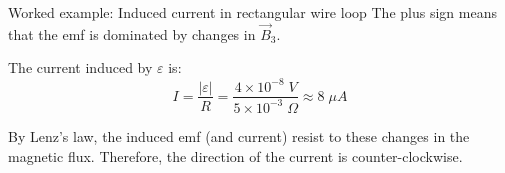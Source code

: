 {\begin{frame}{Worked example: Induced current in rectangular wire loop}
  The plus sign means that the emf is dominated by changes in $\vec{B}_3$.

  The current induced by $\varepsilon$ is:
  \begin{equation*}
    I = \frac{|\varepsilon|}{R} = \frac{4 \times 10^{-8} \; V}{5 \times 10^{-3} \; \Omega}
      \approx 8 \; {\mu}A
  \end{equation*}

  By Lenz's law, the induced emf (and current) resist to these changes in the magnetic flux.
  Therefore, the direction of the current is counter-clockwise.

\end{frame}

} %


%
%

